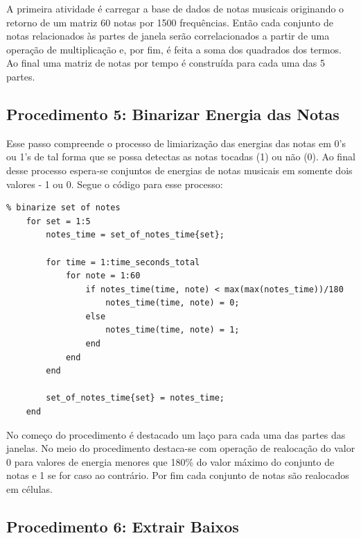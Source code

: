 A primeira atividade é carregar a base de dados de notas musicais originando o retorno de um matriz 60 notas por 1500 frequências. Então cada conjunto de notas relacionados às partes de janela serão correlacionados a partir de uma operação de multiplicação e, por fim, é feita a soma dos quadrados dos termos. Ao final uma matriz de notas por tempo é construída para cada uma das 5 partes.

\subsection{Procedimento 5: Binarizar Energia das Notas}

Esse passo compreende o processo de limiarização das energias das notas em 0's ou 1's de tal forma que se possa detectas as notas tocadas (1) ou não (0). Ao final desse processo espera-se conjuntos de energias de notas musicais em somente dois valores - 1 ou 0. Segue o código para esse processo:
\begin{lstlisting}
% binarize set of notes
    for set = 1:5
        notes_time = set_of_notes_time{set};
        
        for time = 1:time_seconds_total
            for note = 1:60
                if notes_time(time, note) < max(max(notes_time))/180
                    notes_time(time, note) = 0;
                else
                    notes_time(time, note) = 1;
                end
            end
        end

        set_of_notes_time{set} = notes_time;
    end
\end{lstlisting}

No começo do procedimento é destacado um laço para cada uma das partes das janelas. No meio do procedimento destaca-se com operação de realocação do valor 0 para valores de energia menores que 180\% do valor máximo do conjunto de notas e 1 se for caso ao contrário. Por fim cada conjunto de notas são realocados em células.

\subsection{Procedimento 6: Extrair Baixos}

